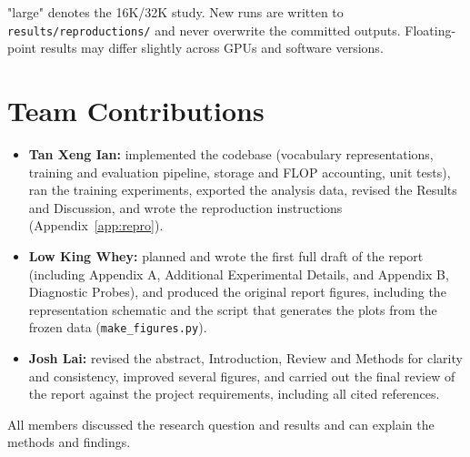 \documentclass[10pt,a4paper]{article}
\begin{document}
"large" denotes the 16K/32K study. New runs are written to \texttt{results/reproductions/} and never
overwrite the committed outputs. Floating-point results may differ slightly across GPUs and software
versions.

\section{Team Contributions}
\begin{itemize}
  \item \textbf{Tan Xeng Ian:} implemented the codebase (vocabulary representations, training and
  evaluation pipeline, storage and FLOP accounting, unit tests), ran the training experiments,
  exported the analysis data, revised the Results and Discussion, and wrote the reproduction
  instructions (Appendix~\ref{app:repro}).
  \item \textbf{Low King Whey:} planned and wrote the first full draft of the report (including
  Appendix A, Additional Experimental Details, and Appendix B, Diagnostic Probes), and produced the
  original report figures, including the representation schematic and the script that generates
  the plots from the frozen data (\texttt{make\_figures.py}).
  \item \textbf{Josh Lai:} revised the abstract, Introduction, Review and Methods for clarity and
  consistency, improved several figures, and carried out the final review of the report
  against the project requirements, including all cited references.
\end{itemize}
All members discussed the research question and results and can explain the methods and findings.
\end{document}

